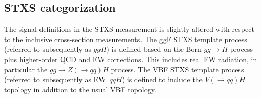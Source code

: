 \subsection{STXS categorization}
\label{subsec:STXS-categorization}

The signal definitions in the STXS measurement is slightly altered with respect to the inclusive cross-section measurements.  
The ggF STXS template process (referred to subsequently as $ggH$) is defined based on the Born $gg \to H$ process plus higher-order QCD and EW corrections. This includes real EW radiation, in particular the $gg \to Z(\to q\bar{q})H$ process. The VBF STXS template process (referred to subsequently as EW~$qqH$) is defined to include the $V(\to qq)H$ topology in addition to the usual VBF topology.~\cite{HWWPaper}

